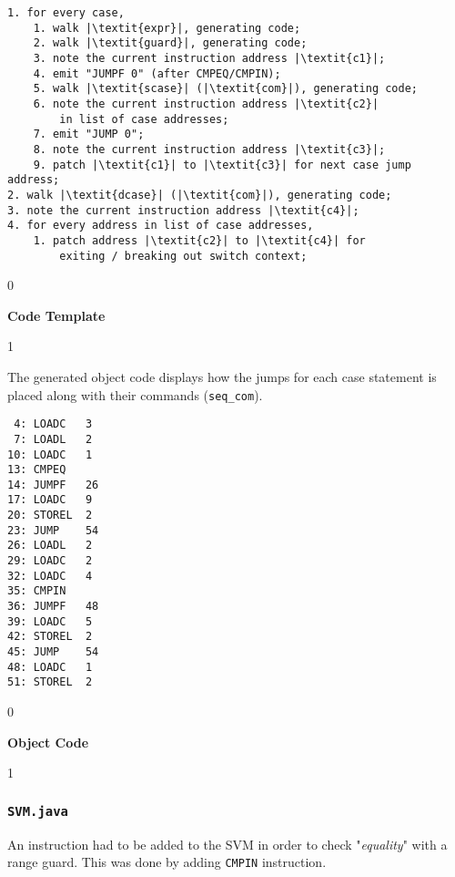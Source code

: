 \documentclass{article}
\newcommand{\code}[1]{\texttt{#1}}
\newenvironment{codelst}{\captionsetup{type=listing}}{}
\newcommand{\dividestages}{0}
\newcommand{\showobjectcode}{0}
\newcommand{\act}[1]{
    \if\dividestages1
        \subsubsection{#1}
    \fi
}
\newcommand{\codecaption}[1]{
    \if\dividestages0
        \vspace{-0.75cm}
        \caption{\textbf{#1}}
        \vspace{0.4cm}
    \fi
}
\begin{document}
\begin{codelst}
\begin{verbatim}
1. for every case,
	1. walk |\textit{expr}|, generating code;
	2. walk |\textit{guard}|, generating code;
	3. note the current instruction address |\textit{c1}|;
	4. emit "JUMPF 0" (after CMPEQ/CMPIN);
	5. walk |\textit{scase}| (|\textit{com}|), generating code;
	6. note the current instruction address |\textit{c2}|
	    in list of case addresses;
	7. emit "JUMP 0";
	8. note the current instruction address |\textit{c3}|;
	9. patch |\textit{c1}| to |\textit{c3}| for next case jump address;
2. walk |\textit{dcase}| (|\textit{com}|), generating code;
3. note the current instruction address |\textit{c4}|;
4. for every address in list of case addresses,
	1. patch address |\textit{c2}| to |\textit{c4}| for
	    exiting / breaking out switch context;
\end{verbatim}
\codecaption{Code Template}
\end{codelst}

\if\showobjectcode1

\vspace{0.5cm}

\noindent The generated object code displays how the jumps for each case statement is placed along with their commands (\code{seq\_com}).

\vspace{0.5cm}

\begin{codelst}
\begin{verbatim}
 4: LOADC   3
 7: LOADL   2
10: LOADC   1
13: CMPEQ
14: JUMPF   26
17: LOADC   9
20: STOREL  2
23: JUMP    54
26: LOADL   2
29: LOADC   2
32: LOADC   4
35: CMPIN
36: JUMPF   48
39: LOADC   5
42: STOREL  2
45: JUMP    54
48: LOADC   1
51: STOREL  2
\end{verbatim}
\codecaption{Object Code}
\end{codelst}

\fi

\fi


\act{\code{SVM.java}}

\vspace{0.5cm}

\noindent An instruction had to be added to the SVM in order to check "\textit{equality}" with a range guard. This was done by adding \code{CMPIN} instruction.

\vspace{0.5cm}
\end{document}
